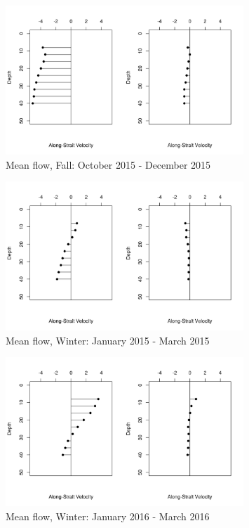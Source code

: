 \documentclass[12pt]{dforeport}
\begin{document}
\begin{figure}  
\centering
\includegraphics[width = 0.8\textwidth]{./figures/41_smf_fall_2015.png}
\caption[Mean flow, Fall, 2015]{Mean flow, Fall: October 2015 - December 2015}
\label{f:smf_f_2015}
\end{figure}


\begin{figure}  
\centering
\includegraphics[width = 0.8\textwidth]{./figures/42_smf_winter_2015.png}
\caption[Mean flow, Winter, 2015]{Mean flow, Winter: January 2015 - March 2015}
\label{f:smf_w_2015}
\end{figure}

\begin{figure}  
\centering
\includegraphics[width = 0.8\textwidth]{./figures/43_smf_winter_2016.png}
\caption[Mean flow, Winter, 2016]{Mean flow, Winter: January 2016 - March 2016}
\label{f:smf_w_2016}
\end{figure}
\end{document}
